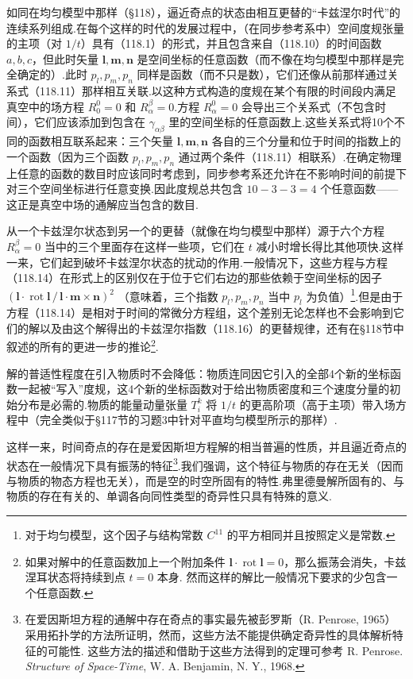 如同在均匀模型中那样（§118），逼近奇点的状态由相互更替的“卡兹涅尔时代”的连续系列组成.在每个这样的时代的发展过程中，（在同步参考系中）空间度规张量的主项（对 $1/t$）具有（118.1）的形式，并且包含来自（118.10）的时间函数 $a,b,c$，但此时矢量 $\boldsymbol{l},\boldsymbol{m},\boldsymbol{n}$ 是空间坐标的任意函数（而不像在均匀模型中那样是完全确定的）.此时 $p_{l},p_{m},p_{n}$ 同样是函数（而不只是数），它们还像从前那样通过关系式（118.11）那样相互关联.以这种方式构造的度规在某个有限的时间段内满足真空中的场方程 $R_{0}^{0}=0$ 和 $R_{\alpha}^{\beta}=0$.方程 $R_{\alpha}^{0}=0$ 会导出三个关系式（不包含时间），它们应该添加到包含在 $\gamma_{\alpha\beta}$ 里的空间坐标的任意函数上.这些关系式将10个不同的函数相互联系起来：三个矢量 $\boldsymbol{l},\boldsymbol{m},\boldsymbol{n}$ 各自的三个分量和位于时间的指数上的一个函数（因为三个函数 $p_{l},p_{m},p_{n}$ 通过两个条件（118.11）相联系）.在确定物理上任意的函数的数目时应该同时考虑到，同步参考系还允许在不影响时间的前提下对三个空间坐标进行任意变换.因此度规总共包含 $10-3-3=4$ 个任意函数——这正是真空中场的通解应当包含的数目.

从一个卡兹涅尔状态到另一个的更替（就像在均匀模型中那样）源于六个方程 $R_{\alpha}^{\beta}=0$ 当中的三个里面存在这样一些项，它们在 $t$ 减小时增长得比其他项快.这样一来，它们起到破坏卡兹涅尔状态的扰动的作用.一般情况下，这些方程与方程（118.14）在形式上的区别仅在于位于它们右边的那些依赖于空间坐标的因子
$(\boldsymbol{l}\cdot\operatorname{rot}\boldsymbol{l}\,/\,\boldsymbol{l}\cdot\boldsymbol{m}\times\boldsymbol{n})^{2}$
（意味着，三个指数 $p_{l},p_{m},p_{n}$ 当中 $p_{l}$ 为负值）\footnote{对于均匀模型，这个因子与结构常数 $C^{11}$ 的平方相同并且按照定义是常数.}.但是由于方程（118.14）是相对于时间的常微分方程组，这个差别无论怎样也不会影响到它们的解以及由这个解得出的卡兹涅尔指数（118.16）的更替规律，还有在§118节中叙述的所有的更进一步的推论\footnote{如果对解中的任意函数加上一个附加条件 $\boldsymbol{l}\cdot\operatorname{rot}\boldsymbol{l}=0$，那么振荡会消失，卡兹涅耳状态将持续到点 $t=0$ 本身. 然而这样的解比一般情况下要求的少包含一个任意函数.}.

解的普适性程度在引入物质时不会降低：物质连同因它引入的全部4个新的坐标函数一起被“写入”度规，这4个新的坐标函数对于给出物质密度和三个速度分量的初始分布是必需的.物质的能量动量张量 $T_{i}^{k}$ 将 $1/t$ 的更高阶项（高于主项）带入场方程中（完全类似于§117节的习题3中针对平直均匀模型所示的那样）.

这样一来，时间奇点的存在是爱因斯坦方程解的相当普遍的性质，并且逼近奇点的状态在一般情况下具有振荡的特征\footnote{在爱因斯坦方程的通解中存在奇点的事实最先被彭罗斯（R. Penrose, 1965）采用拓扑学的方法所证明，然而，这些方法不能提供确定奇异性的具体解析特征的可能性. 这些方法的描述和借助于这些方法得到的定理可参考 R. Penrose. \textit{Structure of Space-Time}, W. A. Benjamin, N. Y., 1968.}.我们强调，这个特征与物质的存在无关（因而与物质的物态方程也无关），而是空的时空所固有的特性.弗里德曼解所固有的、与物质的存在有关的、单调各向同性类型的奇异性只具有特殊的意义.

